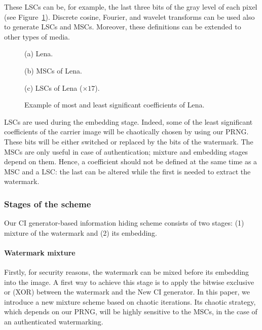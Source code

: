 \documentclass[journal]{IEEEtran}
\begin{document}
These LSCs can be, for example, the last three bits of the gray level of each pixel (see Figure~\ref{fig:MSCLC}). Discrete cosine, Fourier, and wavelet transforms can be used also to generate LSCs and MSCs. Moreover, these definitions can be extended to other types of media.




\begin{figure}[htb]

\begin{minipage}[b]{1.0\linewidth}
  \centering
 \centerline{}
  \centerline{(a) Lena.}
\end{minipage}

\begin{minipage}[b]{.48\linewidth}
  \centering
 \centerline{}
  \centerline{(b) MSCs of Lena.}
\end{minipage}
\hfill
\begin{minipage}[b]{0.48\linewidth}
  \centering
 \centerline{}
  \centerline{(c) LSCs of Lena ($\times 17$).}
\end{minipage}
\caption{Example of most and least significant coefficients of Lena.}
\label{fig:MSCLC}
\end{figure}


LSCs are used during the embedding stage. Indeed, some of the least significant coefficients of the carrier image will be chaotically chosen by using our PRNG. These bits will be either switched or replaced by the bits of the watermark. The MSCs are only useful in case of authentication; mixture and embedding stages depend on them. Hence, a coefficient should not be defined at the same time as a MSC and a LSC: the last can be altered while the first is needed to extract the watermark.

\subsubsection{Stages of the scheme}

Our CI generator-based information hiding scheme consists of two stages: (1) mixture of the watermark and (2) its embedding.

\paragraph{Watermark mixture}

Firstly, for security reasons, the watermark can be mixed before its embedding into the image. A first way to achieve this stage is to apply the bitwise exclusive or (XOR) between the watermark and the New CI generator. In this paper, we introduce a new mixture scheme based on chaotic iterations. Its chaotic strategy, which depends on our PRNG, will be highly sensitive to the MSCs, in the case of an authenticated watermarking.
\end{document}
